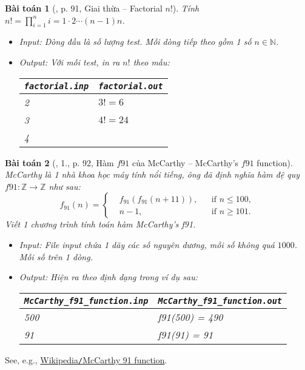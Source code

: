 \documentclass{article}
\newtheorem{baitoan}{Bài toán}
\begin{document}
\begin{baitoan}[\cite{VietSTEM2021}, p. 91, Giai thừa -- Factorial $n!$]
	Tính $n! = \prod_{i=1}^n i = 1\cdot2\cdots(n - 1)n$.
	\begin{itemize}
		\item {\sf Input:} Dòng đầu là số lượng test. Mỗi dòng tiếp theo gồm 1 số $n\in\mathbb{N}$.
		\item {\sf Output:} Với mỗi test, in ra $n!$ theo mẫu:
		\begin{table}[H]
			\centering
			\begin{tabular}{|l|l|}
				\hline
				\texttt{factorial.inp} & \texttt{factorial.out} \\
				\hline
				2 & $3! = 6$ \\
				3 & $4! = 24$ \\
				4 &  \\
				\hline
			\end{tabular}
		\end{table}
	\end{itemize}
\end{baitoan}

\begin{baitoan}[\cite{VietSTEM2021}, 1., p. 92, Hàm $f91$ của McCarthy -- McCarthy's $f91$ function]
	McCarthy là 1 nhà khoa học máy tính nổi tiếng, ông đã định nghĩa hàm đệ quy $f91:\mathbb{Z}\to\mathbb{Z}$ như sau:
	\begin{equation*}
		f_{91}(n) = \left\{\begin{split}
			&f_{91}(f_{91}(n + 11)),&&\mbox{if } n\le100,\\
			&n -1,&&\mbox{if } n\ge101.
		\end{split}\right.
	\end{equation*}
	Viết 1 chương trình tính toán hàm McCarthy's f91.
	\begin{itemize}
		\item {\sf Input:} File input chứa 1 dãy các số nguyên dương, mỗi số không quá $1000$. Mỗi số trên 1 dòng.
		\item {\sf Output:} Hiện ra theo định dạng trong ví dụ sau:
		\begin{table}[H]
			\centering
			\begin{tabular}{|l|l|}
				\hline
				\verb|McCarthy_f91_function.inp| & \verb|McCarthy_f91_function.out| \\
				\hline
				500 & f91(500) = 490 \\
				91 & f91(91) = 91 \\
				\hline
			\end{tabular}
		\end{table}
	\end{itemize}
\end{baitoan}
See, e.g., \href{https://en.wikipedia.org/wiki/McCarthy_91_function}{Wikipedia\texttt{/}McCarthy 91 function}.
\end{document}

